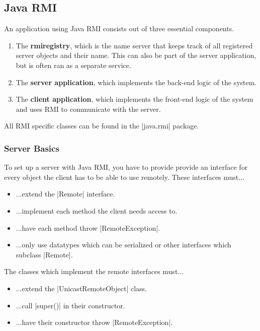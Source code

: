 \documentclass[a4paper]{article}
\begin{document}
\subsection{Java RMI}

An application using Java RMI consists out of three essential components.

\begin{enumerate}
\item The \textbf{rmiregistry}, which is the name server that keeps track of all registered server objects and their name. This can also be part of the server application, but is often ran as a separate service.
\item The \textbf{server application}, which implements the back-end logic of the system.
\item The \textbf{client application}, which implements the front-end logic of the system and uses RMI to communicate with the server.
\end{enumerate}

All RMI specific classes can be found in the |java.rmi| package.

\subsubsection{Server Basics}

To set up a server with Java RMI, you have to provide provide an interface for every object the client has to be able to use remotely. These interfaces must...

\begin{itemize}
\item ...extend the |Remote| interface.
\item ...implement each method the client needs access to.
\item ...have each method throw |RemoteException|.
\item ...only use datatypes which can be serialized or other interfaces which subclass |Remote|.
\end{itemize}

The classes which implement the remote interfaces must...

\begin{itemize}
\item ...extend the |UnicastRemoteObject| class.
\item ...call |super()| in their constructor.
\item ...have their constructor throw |RemoteException|.
\end{itemize}
\end{document}
